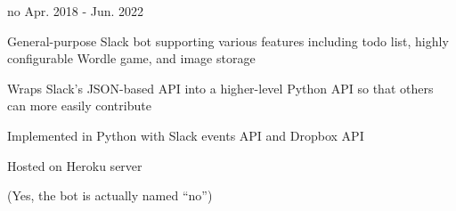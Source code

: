 

\begin{cventries}

  \cventry
    {} %
    {no} %
    {} %
    {Apr. 2018 - Jun. 2022} %
    {
      \begin{cvitems} %
        \item {General-purpose Slack bot supporting various features including todo list, highly configurable Wordle game, and image storage}
        \item {Wraps Slack's JSON-based API into a higher-level Python API so that others can more easily contribute}
        \item {Implemented in Python with Slack events API and Dropbox API}
        \item {Hosted on Heroku server}
        \item {(Yes, the bot is actually named ``no'')}
      \end{cvitems}
    }

\end{cventries}

